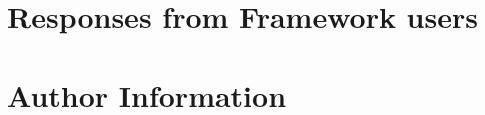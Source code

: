 \documentclass{article}
\begin{document}
\newpage
{}


\newpage
\begin{appendices}

\section{Responses from Framework users}
\label{app:answers}


\newpage
\section{Author Information}
\label{app:authors}


\end{appendices}
\end{document}
